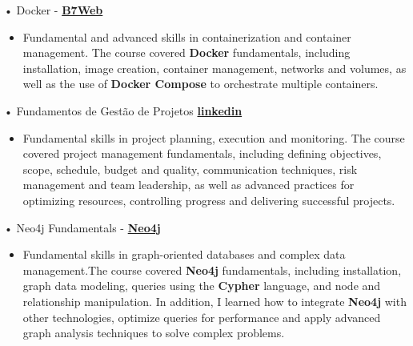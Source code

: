 \documentclass[a4paper]{article}
\begin{document}
\vspace*{1mm}
• Docker - \textbf{\href{https://drive.google.com/drive/folders/1YKThgvnT5h1bA_Hb0uDiIf7p8Qiph-NC}{B7Web}}\\
\begin{itemize}
    \item [] Fundamental and advanced skills in containerization and container management. The course covered \textbf{Docker} fundamentals, including installation, image creation, container management, networks and volumes, as well as the use of \textbf{Docker Compose} to orchestrate multiple containers.
\end{itemize}
\vspace*{1mm}
• Fundamentos de Gestão de Projetos \textbf{\href{https://www.linkedin.com/learning/certificates/0fc1a744c87dc72f53e8c694fd58809808a183327167377cb224c1ac43e732b6}{linkedin}}\\
\begin{itemize}
    \item [] Fundamental skills in project planning, execution and monitoring. The course covered project management fundamentals, including defining objectives, scope, schedule, budget and quality, communication techniques, risk management and team leadership, as well as advanced practices for optimizing resources, controlling progress and delivering successful projects.
\end{itemize}
\vspace*{1mm}
• Neo4j Fundamentals - \textbf{\href{https://graphacademy.neo4j.com/c/9d25b359-5995-4053-8475-7b2bf61f163e/}{Neo4j}}\\
\begin{itemize} \itemsep -3pt
    \item[] Fundamental skills in graph-oriented databases and complex data management.The course covered \textbf{Neo4j} fundamentals, including installation, graph data modeling, queries using the \textbf{Cypher} language, and node and relationship manipulation. In addition, I learned how to integrate \textbf{Neo4j} with other technologies, optimize queries for performance and apply advanced graph analysis techniques to solve complex problems.
\end{itemize}
\vspace{2mm}

\
\end{document}
